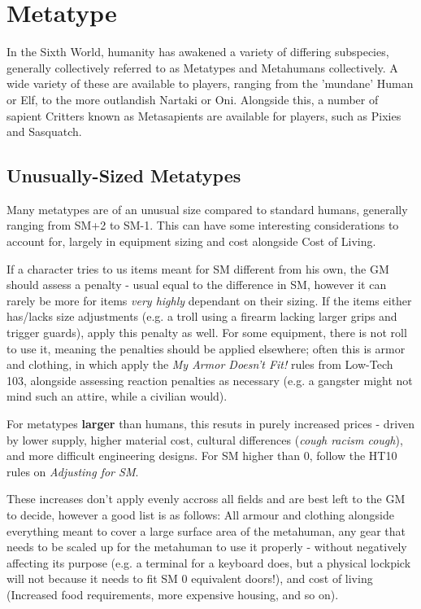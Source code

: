 \section{Metatype}

\begin{multicols*}{3}
	
	In the Sixth World, humanity has awakened a variety of differing subspecies, generally collectively referred to as Metatypes and Metahumans collectively. A wide variety of these are available to players, ranging from the 'mundane' Human or Elf, to the more outlandish Nartaki or Oni. Alongside this, a number of sapient Critters known as Metasapients are available for players, such as Pixies and Sasquatch.
	
	\subsection{Unusually-Sized Metatypes}\label{metatype_sizing}
	
	Many metatypes are of an unusual size compared to standard humans, generally ranging from SM+2 to SM-1. This can have some interesting considerations to account for, largely in equipment sizing and cost alongside Cost of Living.
	
	If a character tries to us items meant for SM different from his own, the GM should assess a penalty - usual equal to the difference in SM, however it can rarely be more for items \textit{very highly} dependant on their sizing. If the items either has/lacks size adjustments (e.g. a troll using a firearm lacking larger grips and trigger guards), apply this penalty as well. For some equipment, there is not roll to use it, meaning the penalties should be applied elsewhere; often this is armor and clothing, in which apply the \textit{My Armor Doesn't Fit!} rules from Low-Tech 103, alongside assessing reaction penalties as necessary (e.g. a gangster might not mind such an attire, while a civilian would).
	
	For metatypes \textbf{larger} than humans, this resuts in purely increased prices - driven by lower supply, higher material cost, cultural differences (\textit{cough racism cough}), and  more difficult engineering designs. For SM higher than 0, follow the HT10 rules on \textit{Adjusting for SM}.
	
	These increases don't apply evenly accross all fields and are best left to the GM to decide, however a good list is as follows: All armour and clothing alongside everything meant to cover a large surface area of the metahuman, any gear that needs to be scaled up for the metahuman to use it properly - without negatively affecting its purpose (e.g. a terminal for a keyboard does, but a physical lockpick will not because it needs to fit SM 0 equivalent doors!), and cost of living (Increased food requirements, more expensive housing, and so on).
	

\end{multicols*}
